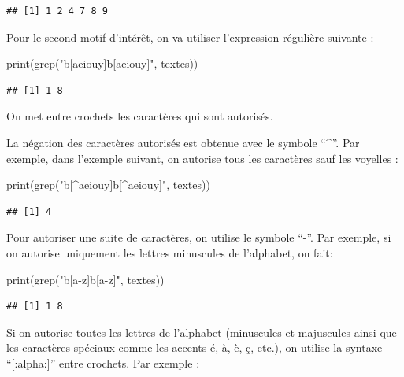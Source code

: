 \documentclass[
]{book}
\newenvironment{Shaded}{\begin{snugshade}}{\end{snugshade}}
\newcommand{\FunctionTok}[1]{\textcolor[rgb]{0.00,0.00,0.00}{#1}}
\newcommand{\NormalTok}[1]{#1}
\newcommand{\StringTok}[1]{\textcolor[rgb]{0.31,0.60,0.02}{#1}}
\theoremstyle{definition}
\theoremstyle{definition}
\theoremstyle{definition}
\theoremstyle{definition}
\theoremstyle{remark}
\begin{document}
\begin{verbatim}
## [1] 1 2 4 7 8 9
\end{verbatim}

Pour le second motif d'intérêt, on va utiliser l'expression régulière suivante :

\begin{Shaded}
\begin{Highlighting}[]
\FunctionTok{print}\NormalTok{(}\FunctionTok{grep}\NormalTok{(}\StringTok{"b[aeiouy]b[aeiouy]"}\NormalTok{, textes))}
\end{Highlighting}
\end{Shaded}

\begin{verbatim}
## [1] 1 8
\end{verbatim}

On met entre crochets les caractères qui sont autorisés.

La négation des caractères autorisés est obtenue avec le symbole ``\^{}''. Par exemple, dans l'exemple suivant, on autorise tous les caractères sauf les voyelles :

\begin{Shaded}
\begin{Highlighting}[]
\FunctionTok{print}\NormalTok{(}\FunctionTok{grep}\NormalTok{(}\StringTok{"b[\^{}aeiouy]b[\^{}aeiouy]"}\NormalTok{, textes))}
\end{Highlighting}
\end{Shaded}

\begin{verbatim}
## [1] 4
\end{verbatim}

Pour autoriser une suite de caractères, on utilise le symbole ``-''. Par exemple, si on autorise uniquement les lettres minuscules de l'alphabet, on fait:

\begin{Shaded}
\begin{Highlighting}[]
\FunctionTok{print}\NormalTok{(}\FunctionTok{grep}\NormalTok{(}\StringTok{"b[a{-}z]b[a{-}z]"}\NormalTok{, textes))}
\end{Highlighting}
\end{Shaded}

\begin{verbatim}
## [1] 1 8
\end{verbatim}

Si on autorise toutes les lettres de l'alphabet (minuscules et majuscules ainsi que les caractères spéciaux comme les accents é, à, è, ç, etc.), on utilise la syntaxe ``{[}:alpha:{]}'' entre crochets. Par exemple :
\end{document}
